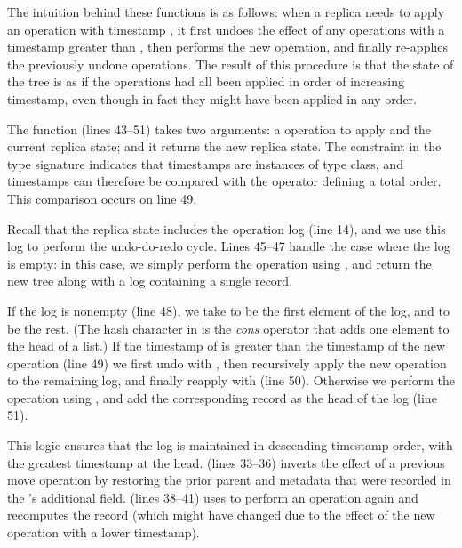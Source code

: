 \documentclass[sigconf]{acmart}
\begin{document}
The intuition behind these functions is as follows: when a replica needs to apply an operation with timestamp , it first undoes the effect of any operations with a timestamp greater than , then performs the new operation, and finally re-applies the previously undone operations.
The result of this procedure is that the state of the tree is as if the operations had all been applied in order of increasing timestamp, even though in fact they might have been applied in any order.

The  function (lines 43--51) takes two arguments: a  operation to apply and the current replica state; and it returns the new replica state.
The constraint  in the type signature indicates that timestamps  are instances of  type class, and timestamps can therefore be compared with the \isa{<} operator defining a total order.
This comparison occurs on line 49.

Recall that the replica state includes the operation log (line 14), and we use this log to perform the undo-do-redo cycle.
Lines 45--47 handle the case where the log is empty: in this case, we simply perform the operation using , and return the new tree along with a log containing a single  record.

If the log is nonempty (line 48), we take  to be the first element of the log, and  to be the rest.
(The hash character in  is the \emph{cons} operator that adds one element to the head of a list.)
If the timestamp of  is greater than the timestamp of the new operation (line 49) we first undo  with , then recursively apply the new operation to the remaining log, and finally reapply  with  (line 50).
Otherwise we perform the operation using , and add the corresponding  record as the head of the log (line 51).

This logic ensures that the log is maintained in descending timestamp order, with the greatest timestamp at the head.
 (lines 33--36) inverts the effect of a previous move operation by restoring the prior parent and metadata that were recorded in the 's additional field.
 (lines 38--41) uses  to perform an operation again and recomputes the  record (which might have changed due to the effect of the new operation with a lower timestamp).
\end{document}
